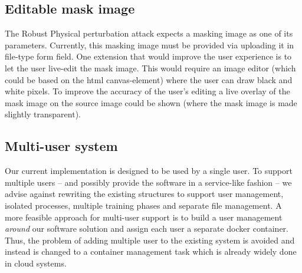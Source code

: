\subsection{Editable mask image}

The Robust Physical perturbation attack expects a masking image as one of its parameters. Currently, this masking image must be provided via uploading it in file-type form field. One extension that would improve the user experience is to let the user live-edit the mask image. This would require an image editor (which could be based on the html canvas-element) where the user can draw black and white pixels. To improve the accuracy of the user's editing a live overlay of the mask image on the source image could be shown (where the mask image is made slightly transparent).

\subsection{Multi-user system}

Our current implementation is designed to be used by a single user. To support multiple users -- and possibly provide the software in a service-like fashion -- we advise against rewriting the existing structures to support user management, isolated processes, multiple training phases and separate file management. A more feasible approach for multi-user support is to build a user management \emph{around} our software solution and assign each user a separate docker container. Thus, the problem of adding multiple user to the existing system is avoided and instead is changed to a container management task which is already widely done in cloud systems. 